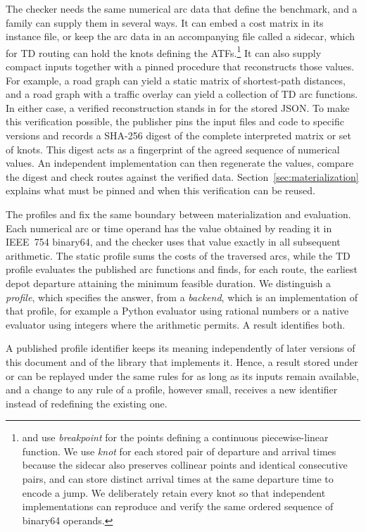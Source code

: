 The checker needs the same numerical arc data that define the benchmark, and a family can supply them in several ways. It can embed a cost matrix in its instance file, or keep the arc data in an accompanying file called a sidecar, which for TD routing can hold the knots defining the ATFs.\footnote{\textcite[Sec.~3.1]{visserEfficientMoveEvaluations2020} and \textcite[Sec.~2]{blauthVehicleRoutingTimedependent2024} use \emph{breakpoint} for the points defining a continuous piecewise-linear function. We use \emph{knot} for each stored pair of departure and arrival times because the sidecar also preserves collinear points and identical consecutive pairs, and can store distinct arrival times at the same departure time to encode a jump. We deliberately retain every knot so that independent implementations can reproduce and verify the same ordered sequence of binary64 operands.} It can also supply compact inputs together with a pinned procedure that reconstructs those values. For example, a road graph can yield a static matrix of shortest-path distances, and a road graph with a traffic overlay can yield a collection of TD arc functions. In either case, a verified reconstruction stands in for the stored JSON. To make this verification possible, the publisher pins the input files and code to specific versions and records a SHA-256 digest of the complete interpreted matrix or set of knots. This digest acts as a fingerprint of the agreed sequence of numerical values. An independent implementation can then regenerate the values, compare the digest and check routes against the verified data. Section~\ref{sec:materialization} explains what must be pinned and when this verification can be reused.

The profiles  and  fix the same boundary between materialization and evaluation. Each numerical arc or time operand has the value obtained by reading it in IEEE~754 binary64, and the checker uses that value exactly in all subsequent arithmetic. The static profile sums the costs of the traversed arcs, while the TD profile evaluates the published arc functions and finds, for each route, the earliest depot departure attaining the minimum feasible duration. We distinguish a \emph{profile}, which specifies the answer, from a \emph{backend}, which is an implementation of that profile, for example a Python evaluator using rational numbers or a native evaluator using integers where the arithmetic permits. A result identifies both.

A published profile identifier keeps its meaning independently of later versions of this document and of the library that implements it. Hence, a result stored under  or  can be replayed under the same rules for as long as its inputs remain available, and a change to any rule of a profile, however small, receives a new identifier instead of redefining the existing one.

